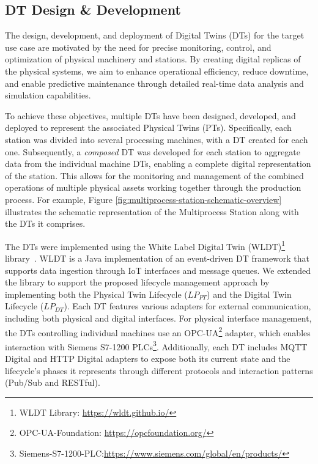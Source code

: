 \subsection{DT Design \& Development}

The design, development, and deployment of Digital Twins (DTs) for the target use case are motivated by the need for precise monitoring, control, and optimization of physical machinery and stations. By creating digital replicas of the physical systems, we aim to enhance operational efficiency, reduce downtime, and enable predictive maintenance through detailed real-time data analysis and simulation capabilities.

To achieve these objectives, multiple DTs have been designed, developed, and deployed to represent the associated Physical Twins (PTs). Specifically, each station was divided into several processing machines, with a DT created for each one. Subsequently, a \textit{composed} DT was developed for each station to aggregate data from the individual machine DTs, enabling a complete digital representation of the station. This allows for the monitoring and management of the combined operations of multiple physical assets working together through the production process. For example, Figure \ref{fig:multiprocess-station-schematic-overview} illustrates the schematic representation of the Multiprocess Station along with the DTs it comprises.

The DTs were implemented using the White Label Digital Twin (WLDT)\footnote{WLDT Library: \url{https://wldt.github.io/}} library~\cite{wldt_picone_2021}. WLDT is a Java implementation of an event-driven DT framework that supports data ingestion through IoT interfaces and message queues. We extended the library to support the proposed lifecycle management approach by implementing both the Physical Twin Lifecycle ($LP_{PT}$) and the Digital Twin Lifecycle ($LP_{DT}$). Each DT features various adapters for external communication, including both physical and digital interfaces. For physical interface management, the DTs controlling individual machines use an OPC-UA\footnote{OPC-UA-Foundation: \url{https://opcfoundation.org/}} adapter, which enables interaction with Siemens S7-1200 PLCs\footnote{Siemens-S7-1200-PLC:\url{https://www.siemens.com/global/en/products/}}. Additionally, each DT includes MQTT\cite{mqtt} Digital and HTTP Digital adapters to expose both its current state and the lifecycle's phases it represents through different protocols and interaction patterns (Pub/Sub and RESTful).

